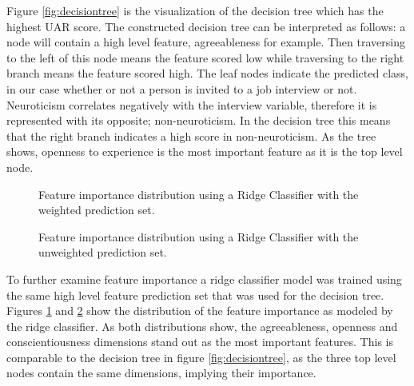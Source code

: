 Figure \ref{fig:decisiontree} is the visualization of the decision tree which has the highest UAR score. The constructed decision tree can be interpreted as follows: a node will contain a high level feature, agreeableness for example. Then traversing to the left of this node means the feature scored low while traversing to the right branch means the feature scored high. The leaf nodes indicate the predicted class, in our case whether or not a person is invited to a job interview or not. Neuroticism correlates negatively with the interview variable, therefore it is represented with its opposite; non-neuroticism. In the decision tree this means that the right branch indicates a high score in non-neuroticism. As the tree shows, openness to experience is the most important feature as it is the top level node. 

\begin{figure*}[h]
  \centering
  
  \caption{Decision Tree of the personality traits, arousal and valence dimensions, predicting the interview invitation variable.}
  \label{fig:decisiontree}
\end{figure*}

\begin{figure}[h]
  \centering
  
  \caption{Feature importance distribution using a Ridge Classifier with the weighted prediction set.}
  \label{fig:featureimp_weighted}
\end{figure}

\begin{figure}[h]
  \centering
  
  \caption{Feature importance distribution using a Ridge Classifier with the unweighted prediction set.}
  \label{fig:featureimp_unweighted}
\end{figure}

To further examine feature importance a ridge classifier model was trained using the same high level feature prediction set that was used for the decision tree. Figures \ref{fig:featureimp_weighted} and \ref{fig:featureimp_unweighted} show the distribution of the feature importance as modeled by the ridge classifier. As both distributions show, the agreeableness, openness and conscientiousness dimensions stand out as the most important features. This is comparable to the decision tree in figure \ref{fig:decisiontree}, as the three top level nodes contain the same dimensions, implying their importance.  